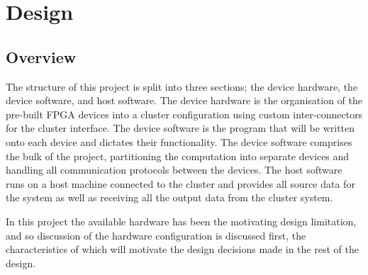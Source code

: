 \chapter{Design}
\renewcommand{\baselinestretch}{\mystretch}
\label{chap:design}
\section{Overview}
The structure of this project is split into three sections; the device hardware, the device software, and host software. The device hardware is the organisation of the pre-built FPGA devices into a cluster configuration using custom inter-connectors for the cluster interface. The device software is the program that will be written onto each device and dictates their functionality. The device software comprises the bulk of the project, partitioning the computation into separate devices and handling all communication protocols between the devices. The host software runs on a host machine connected to the cluster and provides all source data for the system as well as receiving all the output data from the cluster system.


In this project the available hardware has been the motivating design limitation, and so discussion of the hardware configuration is discussed first, the characteristics of which will motivate the design decisions made in the rest of the design.

